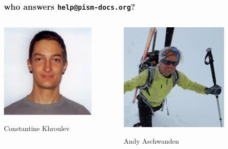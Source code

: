 \documentclass[hide notes,intlimits]{beamer}
\begin{document}
\begin{frame}
  \frametitle{who answers \texttt{help@pism-docs.org}?}
  \begin{columns}
    \begin{column}{0.5\textwidth}
      \begin{center}
      \includegraphics[width=0.8\textwidth]{Constantine-2x2-small.jpg}
      
      Constantine Khroulev
      \end{center}
    \end{column}
    \begin{column}{0.5\textwidth}
      \begin{center}
      \includegraphics[width=0.8\textwidth]{andy_valdez_crop.jpg}
      
      Andy Aschwanden
      \end{center}
    \end{column}
  \end{columns}

\end{frame}
\end{document}
